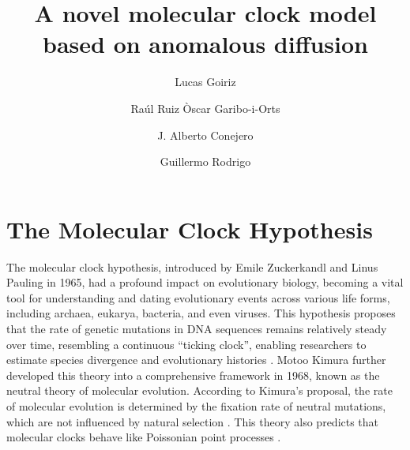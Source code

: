 \documentclass{./LatexTemplate/svproc}
\begin{document}
\mainmatter              %
%
\title{A novel molecular clock model based on anomalous diffusion}
%
%
\author{Lucas Goiriz \and Raúl Ruiz
Òscar Garibo-i-Orts \and J. Alberto Conejero \and Guillermo Rodrigo}
%
%
%

\maketitle              %

\begin{abstract}

\end{abstract}
%
\section{The Molecular Clock Hypothesis}
%
The molecular clock hypothesis, introduced by Emile Zuckerkandl and Linus Pauling in 1965, had a profound impact on evolutionary biology, becoming a vital tool for understanding and dating evolutionary events across various life forms, including archaea, eukarya, bacteria, and even viruses. This hypothesis proposes that the rate of genetic mutations in DNA sequences remains relatively steady over time, resembling a continuous ``ticking clock'', enabling researchers to estimate species divergence and evolutionary histories \cite{zuckerkandl1965}. Motoo Kimura further developed this theory into a comprehensive framework in 1968, known as the neutral theory of molecular evolution. According to Kimura's proposal, the rate of molecular evolution is determined by the fixation rate of neutral mutations, which are not influenced by natural selection \cite{kimura1968}. This theory also predicts that molecular clocks behave like Poissonian point processes \cite{kimura1971,kimura1987}.
\end{document}
